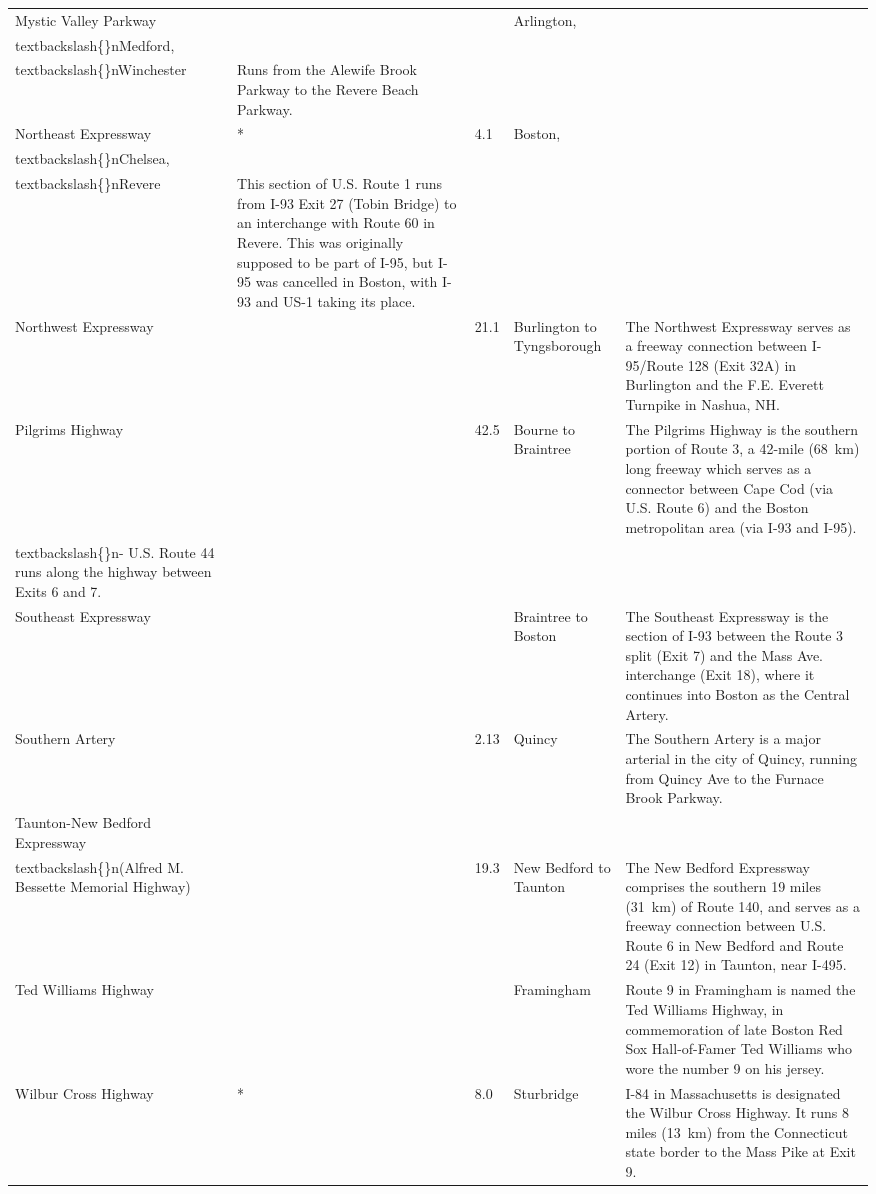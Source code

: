 \documentclass{article}
\begin{document}
\begin{tabular}{lllll}
Mystic Valley Parkway &  &  & Arlington,\\textbackslash\{\}nMedford,\\textbackslash\{\}nWinchester & Runs from the Alewife Brook Parkway to the Revere Beach Parkway. \\
Northeast Expressway & * & 4.1 & Boston,\\textbackslash\{\}nChelsea,\\textbackslash\{\}nRevere & This section of U.S. Route 1 runs from I-93 Exit 27 (Tobin Bridge) to an interchange with Route 60 in Revere. This was originally supposed to be part of I-95, but I-95 was cancelled in Boston, with I-93 and US-1 taking its place. \\
Northwest Expressway &  & 21.1 & Burlington to Tyngsborough & The Northwest Expressway serves as a freeway connection between I-95/Route 128 (Exit 32A) in Burlington and the F.E. Everett Turnpike in Nashua, NH. \\
Pilgrims Highway &  & 42.5 & Bourne to Braintree & The Pilgrims Highway is the southern portion of Route 3, a 42-mile (68 km) long freeway which serves as a connector between Cape Cod (via U.S. Route 6) and the Boston metropolitan area (via I-93 and I-95).\\textbackslash\{\}n- U.S. Route 44 runs along the highway between Exits 6 and 7. \\
Southeast Expressway &  &  & Braintree to Boston & The Southeast Expressway is the section of I-93 between the Route 3 split (Exit 7) and the Mass Ave. interchange (Exit 18), where it continues into Boston as the Central Artery. \\
Southern Artery &  & 2.13 & Quincy & The Southern Artery is a major arterial in the city of Quincy, running from Quincy Ave to the Furnace Brook Parkway. \\
Taunton-New Bedford Expressway\\textbackslash\{\}n(Alfred M. Bessette Memorial Highway) &  & 19.3 & New Bedford to Taunton & The New Bedford Expressway comprises the southern 19 miles (31 km) of Route 140, and serves as a freeway connection between U.S. Route 6 in New Bedford and Route 24 (Exit 12) in Taunton, near I-495. \\
Ted Williams Highway &  &  & Framingham & Route 9 in Framingham is named the Ted Williams Highway, in commemoration of late Boston Red Sox Hall-of-Famer Ted Williams who wore the number 9 on his jersey. \\
Wilbur Cross Highway & * & 8.0 & Sturbridge & I-84 in Massachusetts is designated the Wilbur Cross Highway. It runs 8 miles (13 km) from the Connecticut state border to the Mass Pike at Exit 9. \\

\end{tabular}
\end{document}
